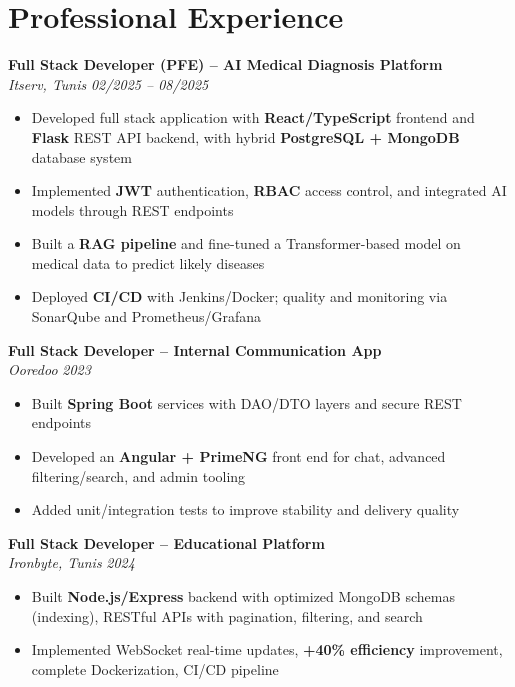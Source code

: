 \documentclass[10pt,a4paper]{article}
\begin{document}
\vspace{6pt}

\section*{Professional Experience}
{\small

\textbf{Full Stack Developer (PFE) -- AI Medical Diagnosis Platform}\\[1pt]
\textit{Itserv, Tunis} \hfill \textit{02/2025 -- 08/2025}
\begin{itemize}
  \item Developed full stack application with \textbf{React/TypeScript} frontend and \textbf{Flask} REST API backend, with hybrid \textbf{PostgreSQL + MongoDB} database system
  \item Implemented \textbf{JWT} authentication, \textbf{RBAC} access control, and integrated AI models through REST endpoints
  \item Built a \textbf{RAG pipeline} and fine-tuned a Transformer-based model on medical data to predict likely diseases
  \item Deployed \textbf{CI/CD} with Jenkins/Docker; quality and monitoring via SonarQube and Prometheus/Grafana
\end{itemize}

\vspace{3pt}
\textbf{Full Stack Developer -- Internal Communication App}\\[1pt]
\textit{Ooredoo} \hfill \textit{2023}
\begin{itemize}
  \item Built \textbf{Spring Boot} services with DAO/DTO layers and secure REST endpoints
  \item Developed an \textbf{Angular + PrimeNG} front end for chat, advanced filtering/search, and admin tooling
  \item Added unit/integration tests to improve stability and delivery quality
\end{itemize}

\vspace{3pt}
\textbf{Full Stack Developer -- Educational Platform}\\[1pt]
\textit{Ironbyte, Tunis} \hfill \textit{2024}
\begin{itemize}
  \item Built \textbf{Node.js/Express} backend with optimized MongoDB schemas (indexing), RESTful APIs with pagination, filtering, and search
  \item Implemented WebSocket real-time updates, \textbf{+40\% efficiency} improvement, complete Dockerization, CI/CD pipeline
\end{itemize}

}
\end{document}
